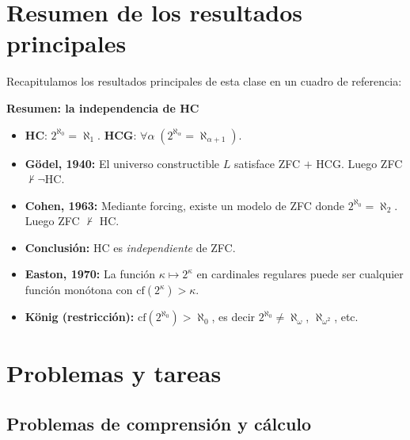 \section{Resumen de los resultados principales}

Recapitulamos los resultados principales de esta clase en un cuadro de referencia:

\begin{importante}
\textbf{Resumen: la independencia de HC}

\begin{itemize}[leftmargin=2em]
  \item \textbf{HC}: $2^{\aleph_0} = \aleph_1$. \quad \textbf{HCG}: $\forall \alpha\; (2^{\aleph_\alpha} = \aleph_{\alpha+1})$.
  \item \textbf{Gödel, 1940:} El universo constructible $L$ satisface ZFC $+$ HCG. Luego ZFC $\not\vdash \neg$HC.
  \item \textbf{Cohen, 1963:} Mediante forcing, existe un modelo de ZFC donde $2^{\aleph_0} = \aleph_2$. Luego ZFC $\not\vdash$ HC.
  \item \textbf{Conclusión:} HC es \emph{independiente} de ZFC.
  \item \textbf{Easton, 1970:} La función $\kappa \mapsto 2^\kappa$ en cardinales regulares puede ser cualquier función monótona con $\mathrm{cf}(2^\kappa) > \kappa$.
  \item \textbf{König (restricción):} $\mathrm{cf}(2^{\aleph_0}) > \aleph_0$, es decir $2^{\aleph_0} \neq \aleph_\omega$, $\aleph_{\omega^2}$, etc.
\end{itemize}
\end{importante}

\section{Problemas y tareas}

\subsection*{Problemas de comprensión y cálculo}

